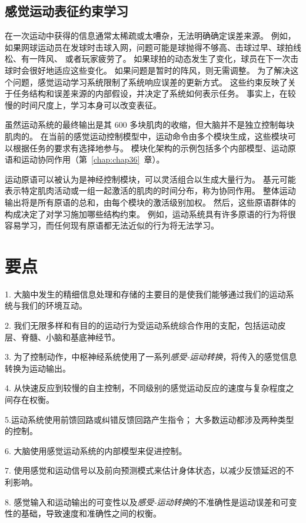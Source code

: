 \subsection{感觉运动表征约束学习}

在一次运动中获得的信息通常太稀疏或太嘈杂，无法明确确定误差来源。
例如，如果网球运动员在发球时击球入网，问题可能是球抛得不够高、击球过早、球拍线松、有一阵风、 或者玩家疲劳了。
如果球拍的动态发生了变化，球员在下一次击球时会很好地适应这些变化。
如果问题是暂时的阵风，则无需调整。
为了解决这个问题，感觉运动学习系统限制了系统响应误差的更新方式。
这些约束反映了关于任务结构和误差来源的内部假设，并决定了系统如何表示任务。
事实上，在较慢的时间尺度上，学习本身可以改变表征。


虽然运动系统的最终输出是其 600 多块肌肉的收缩，但大脑并不是独立控制每块肌肉的。
在当前的感觉运动控制模型中，运动命令由多个模块生成，这些模块可以根据任务的要求有选择地参与。
模块化架构的示例包括多个内部模型、运动原语和运动协同作用（第~\ref{chap:chap36}~章）。


运动原语可以被认为是神经控制模块，可以灵活组合以生成大量行为。
基元可能表示特定肌肉活动或一组一起激活的肌肉的时间分布，称为协同作用。
整体运动输出将是所有原语的总和，由每个模块的激活级别加权。
然后，这些原语群体的构成决定了对学习施加哪些结构约束。
例如，运动系统具有许多原语的行为将很容易学习，而任何现有原语都无法近似的行为将无法学习。



\section{要点}

1. 大脑中发生的精细信息处理和存储的主要目的是使我们能够通过我们的运动系统与我们的环境互动。


2. 我们无限多样和有目的的运动行为受运动系统综合作用的支配，包括运动皮层、脊髓、小脑和基底神经节。


3. 为了控制动作，中枢神经系统使用了一系列\textit{感受-运动转换}，将传入的感觉信息转换为运动输出。


4. 从快速反应到较慢的自主控制，不同级别的感觉运动反应的速度与复杂程度之间存在权衡。


5.运动系统使用前馈回路或纠错反馈回路产生指令；
大多数运动都涉及两种类型的控制。


6. 大脑使用感觉运动系统的内部模型来促进控制。


7. 使用感觉和运动信号以及前向预测模式来估计身体状态，以减少反馈延迟的不利影响。


8. 感觉输入和运动输出的可变性以及\textit{感受-运动转换}的不准确性是运动误差和可变性的基础，导致速度和准确性之间的权衡。


